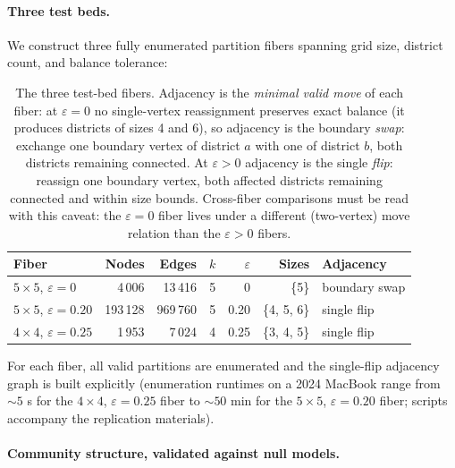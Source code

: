 \documentclass[11pt]{article}
\begin{document}
\paragraph{Three test beds.}\label{sec:fiber-testbeds}

We construct three fully enumerated partition fibers spanning grid
size, district count, and balance tolerance:

\begin{table}[H]
\centering
\small
\begin{tabular}{lrrrrrl}
\toprule
Fiber & Nodes & Edges & $k$ & $\varepsilon$ & Sizes & Adjacency \\
\midrule
$5 \times 5$, $\varepsilon = 0$    & 4\,006   & 13\,416  & 5 & 0    & \{5\}       & boundary swap \\
$5 \times 5$, $\varepsilon = 0.20$ & 193\,128 & 969\,760 & 5 & 0.20 & \{4, 5, 6\} & single flip \\
$4 \times 4$, $\varepsilon = 0.25$ & 1\,953   & 7\,024   & 4 & 0.25 & \{3, 4, 5\} & single flip \\
\bottomrule
\end{tabular}
\caption{The three test-bed fibers. Adjacency is the \emph{minimal
  valid move} of each fiber: at $\varepsilon = 0$ no single-vertex
  reassignment preserves exact balance (it produces districts of sizes
  4 and 6), so adjacency is the boundary \emph{swap}: exchange one
  boundary vertex of district $a$ with one of district $b$, both
  districts remaining connected. At $\varepsilon > 0$ adjacency is the
  single \emph{flip}: reassign one boundary vertex, both affected
  districts remaining connected and within size bounds. Cross-fiber
  comparisons must be read with this caveat: the $\varepsilon = 0$
  fiber lives under a different (two-vertex) move relation than the
  $\varepsilon > 0$ fibers.}\label{tab:fibers}
\end{table}

For each fiber, all valid partitions are enumerated and the single-flip
adjacency graph is built explicitly (enumeration runtimes on a 2024
MacBook range from $\sim 5$ s for the $4 \times 4$,
$\varepsilon = 0.25$ fiber to $\sim 50$ min for the $5 \times 5$,
$\varepsilon = 0.20$ fiber; scripts accompany the replication
materials).

\paragraph{Community structure, validated against null models.}\label{sec:fiber-islands}
\end{document}
